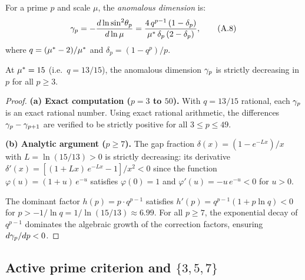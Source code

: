\documentclass[12pt,a4paper]{article}
\begin{document}
\begin{derivedbox}
For a prime $p$ and scale $\mu$, the \emph{anomalous dimension} is:
\begin{equation}
  \gamma_{p} = -\frac{d \ln \sin^2\!\theta_p}{d \ln \mu}
  = \frac{4\,q^{p-1}\,(1 - \delta_p)}{{\mu^{*}}\,\delta_p\,(2 - \delta_p)},
  \tag{A.8}
\end{equation}
where $q = ({\mu^{*}} - 2)/{\mu^{*}}$ and $\delta_p = (1 - q^p)/p$.
\end{derivedbox}

\begin{theorembox}
At ${\mu^{*}} = 15$ (i.e.\ $q = 13/15$), the anomalous dimension
$\gamma_{p}$ is strictly decreasing in $p$ for all $p \geq 3$.

\begin{proof}
\textbf{(a) Exact computation ($p = 3$ to $50$).}
With $q = 13/15$ rational, each $\gamma_{p}$ is an exact rational
number. Using exact rational arithmetic, the differences
$\gamma_{p} - \gamma_{p+1}$ are verified to be strictly positive for all
$3 \leq p \leq 49$.

\textbf{(b) Analytic argument ($p \geq 7$).}
The gap fraction $\delta(x) = (1 - e^{-Lx})/x$ with
$L = \ln(15/13) > 0$ is strictly decreasing: its derivative
$\delta'(x) = [(1 + Lx)\,e^{-Lx} - 1]/x^2 < 0$ since the function
$\varphi(u) = (1+u)\,e^{-u}$ satisfies $\varphi(0) = 1$ and
$\varphi'(u) = -u\,e^{-u} < 0$ for $u > 0$.

The dominant factor $h(p) = p \cdot q^{p-1}$ satisfies
$h'(p) = q^{p-1}(1 + p\ln q) < 0$ for
$p > -1/\ln q = 1/\ln(15/13) \approx 6.99$. For all $p \geq 7$,
the exponential decay of $q^{p-1}$ dominates the algebraic growth of
the correction factors, ensuring $d\gamma_{p}/dp < 0$.
\end{proof}
\end{theorembox}

\subsection{Active prime criterion and $\{3,5,7\}$}
\label{app:active}
\end{document}
